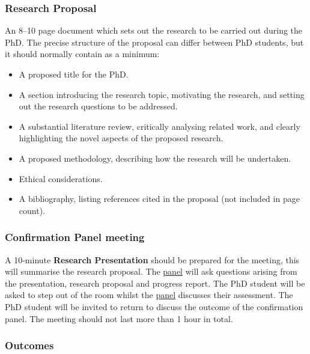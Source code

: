 \documentclass[12pt,a4paper]{article}
\begin{document}
\subsubsection{Research Proposal}
An 8--10 page document which sets out the research to be carried out during the PhD. The precise structure of the proposal can differ between PhD students, but it should normally contain as a minimum:
\begin{itemize}
	\item A proposed title for the PhD.
	\item A section introducing the research topic, motivating the research, and setting out the research questions to be addressed.
	\item A substantial literature review, critically analysing related work, and clearly highlighting the novel aspects of the proposed research.
	\item A proposed methodology, describing how the research will be undertaken.
	\item Ethical considerations.
	\item A bibliography, listing references cited in the proposal (not included in page count).
\end{itemize}


\subsubsection{Confirmation Panel meeting}
A 10-minute \textbf{Research Presentation} should be prepared for the meeting, this will summarise the research proposal. The \hyperref[sec:panel]{panel} will ask questions arising from the presentation, research proposal and progress report. The PhD student will be asked to step out of the room whilst the \hyperref[sec:panel]{panel} discusses their assessment. The PhD student will be invited to return to discuss the outcome of the confirmation panel. The meeting should not last more than 1 hour in total.

\subsubsection{Outcomes}
\end{document}
